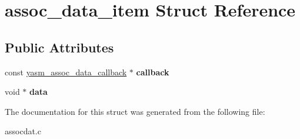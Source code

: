 \hypertarget{structassoc__data__item}{\section{assoc\-\_\-data\-\_\-item Struct Reference}
\label{structassoc__data__item}
}
\subsection*{Public Attributes}
\begin{DoxyCompactItemize}
\item 
\hypertarget{structassoc__data__item_ad5a9ce7dc8bca180e5e7338f1244c385}{const \hyperlink{structyasm__assoc__data__callback}{yasm\-\_\-assoc\-\_\-data\-\_\-callback} $\ast$ {\bfseries callback}}\label{structassoc__data__item_ad5a9ce7dc8bca180e5e7338f1244c385}

\item 
\hypertarget{structassoc__data__item_af9ab6715bcc51344d227d0fde13a7280}{void $\ast$ {\bfseries data}}\label{structassoc__data__item_af9ab6715bcc51344d227d0fde13a7280}

\end{DoxyCompactItemize}


The documentation for this struct was generated from the following file\-:\begin{DoxyCompactItemize}
\item 
assocdat.\-c\end{DoxyCompactItemize}
